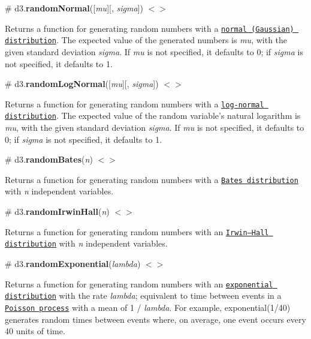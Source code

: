 \label{_randomNormal}%
\# d3.{\bfseries random\+Normal}(\mbox{[}{\itshape mu}\mbox{]}\mbox{[}, {\itshape sigma}\mbox{]}) \href{https://github.com/d3/d3-random/blob/master/src/normal.js}{\tt $<$$>$}

Returns a function for generating random numbers with a \href{https://en.wikipedia.org/wiki/Normal_distribution}{\tt normal (Gaussian) distribution}. The expected value of the generated numbers is {\itshape mu}, with the given standard deviation {\itshape sigma}. If {\itshape mu} is not specified, it defaults to 0; if {\itshape sigma} is not specified, it defaults to 1.

\label{_randomLogNormal}%
\# d3.{\bfseries random\+Log\+Normal}(\mbox{[}{\itshape mu}\mbox{]}\mbox{[}, {\itshape sigma}\mbox{]}) \href{https://github.com/d3/d3-random/blob/master/src/logNormal.js}{\tt $<$$>$}

Returns a function for generating random numbers with a \href{https://en.wikipedia.org/wiki/Log-normal_distribution}{\tt log-\/normal distribution}. The expected value of the random variable’s natural logarithm is {\itshape mu}, with the given standard deviation {\itshape sigma}. If {\itshape mu} is not specified, it defaults to 0; if {\itshape sigma} is not specified, it defaults to 1.

\label{_randomBates}%
\# d3.{\bfseries random\+Bates}({\itshape n}) \href{https://github.com/d3/d3-random/blob/master/src/bates.js}{\tt $<$$>$}

Returns a function for generating random numbers with a \href{https://en.wikipedia.org/wiki/Bates_distribution}{\tt Bates distribution} with {\itshape n} independent variables.

\label{_randomIrwinHall}%
\# d3.{\bfseries random\+Irwin\+Hall}({\itshape n}) \href{https://github.com/d3/d3-random/blob/master/src/irwinHall.js}{\tt $<$$>$}

Returns a function for generating random numbers with an \href{https://en.wikipedia.org/wiki/Irwin–Hall_distribution}{\tt Irwin–\+Hall distribution} with {\itshape n} independent variables.

\label{_randomExponential}%
\# d3.{\bfseries random\+Exponential}({\itshape lambda}) \href{https://github.com/d3/d3-random/blob/master/src/exponential.js}{\tt $<$$>$}

Returns a function for generating random numbers with an \href{https://en.wikipedia.org/wiki/Exponential_distribution}{\tt exponential distribution} with the rate {\itshape lambda}; equivalent to time between events in a \href{https://en.wikipedia.org/wiki/Poisson_point_process}{\tt Poisson process} with a mean of 1 / {\itshape lambda}. For example, exponential(1/40) generates random times between events where, on average, one event occurs every 40 units of time.

